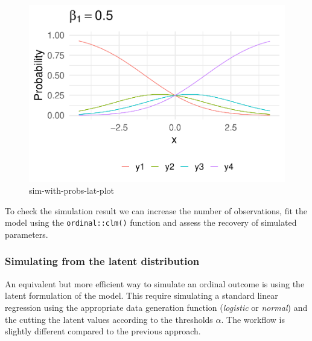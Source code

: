 \documentclass[
  man,floatsintext]{apa6}
\begin{document}
\scriptsize

\begin{figure}

{\centering \includegraphics{paper-new_files/figure-latex/sim-with-probs-lat-plot-1} 

}

\caption{sim-with-probs-lat-plot}\label{fig:sim-with-probs-lat-plot}
\end{figure}

\normalsize

\scriptsize

\normalsize

To check the simulation result we can increase the number of observations, fit the model using the \texttt{ordinal::clm()} function and assess the recovery of simulated parameters.

\scriptsize

\normalsize

\scriptsize

\normalsize

\subsubsection{Simulating from the latent distribution}\label{simulating-from-the-latent-distribution}

An equivalent but more efficient way to simulate an ordinal outcome is using the latent formulation of the model. This require simulating a standard linear regression using the appropriate data generation function (\emph{logistic} or \emph{normal}) and the cutting the latent values according to the thresholds \(\alpha\). The workflow is slightly different compared to the previous approach.
\end{document}
